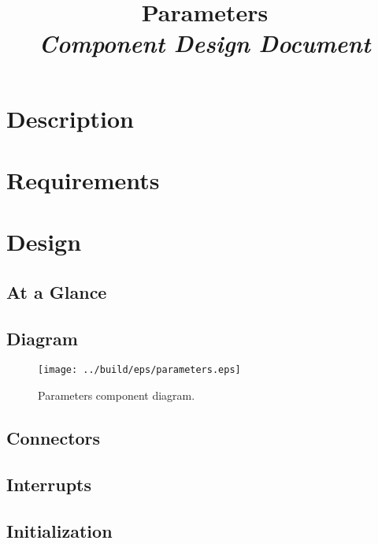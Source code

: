 



\title{\textbf{Parameters} \\
\large\textit{Component Design Document}}
\date{}
\maketitle

\section{Description}


\section{Requirements}


\section{Design}

\subsection{At a Glance}


\subsection{Diagram}
\begin{figure}[H]
  \texttt{[image: ../build/eps/parameters.eps]}
  \caption{Parameters component diagram.}
\end{figure}

\subsection{Connectors}


\subsection{Interrupts}



\subsection{Initialization}



